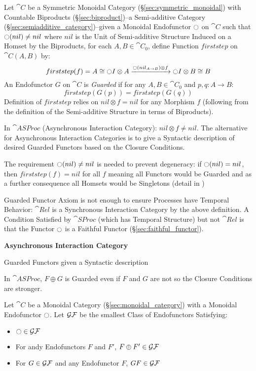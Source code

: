 Let $\cat{C}$ be a Symmetric Monoidal Category
(\S\ref{sec:symmetric_monoidal}) with Countable Biproducts
(\S\ref{sec:biproduct})--a Semi-additive Category
(\S\ref{sec:semiadditive_category})--given a Monoidal Endofunctor $\ocircle$
on $\cat{C}$ such that $\ocircle(nil) \neq nil$ where $nil$ is the
Unit of Semi-additive Structure Induced on a Homset by the Biproducts,
for each $A,B \in \cat{C}_0$, define Function $firststep$ on
$\cat{C}(A,B)$ by:
\[
  firststep(f) = A \cong \ocircle I \otimes A
    \xrightarrow{\ocircle(nil_{A \rightarrow B}) \otimes f}
    \ocircle I \otimes B \cong B
\]
An Endofunctor $G$ on $\cat{C}$ is \emph{Guarded} if for any $A,B \in
\cat{C}_0$ and $p,q : A \rightarrow B$:
\[
  firststep(G(p)) = firststep(G(q))
\]
Definition of $firststep$ relies on $nil \otimes f = nil$ for any
Morphism $f$ (following from the definition of the Semi-additive
Structure in terms of Biproducts).

\fist In $\cat{ASProc}$ (Asynchronous Interaction Category): $nil
\otimes f \neq nil$. The alternative for Asynchronous Interaction
Categories is to give a Syntactic description of desired Guarded
Functors based on the Closure Conditions.

The requirement $\ocircle(nil) \neq nil$ is needed to prevent
degeneracy: if $\ocircle(nil) = nil$, then $firststep(f) = nil$ for
all $f$ meaning all Functors would be Guarded and as a further
consequence all Homsets would be Singletons (detail in
\cite{abramsky-gay-nagarajan96})

Guarded Functor Axiom is not enough to ensure Processes have Temporal
Behavior: $\cat{Rel}$ is a Synchronous Interaction Category by the
above definition. A Condition Satisfied by $\cat{SProc}$ (which has
Temporal Structure) but not $\cat{Rel}$ is that the Functor $\ocircle$
is a Faithful Functor (\S\ref{sec:faithful_functor}).


\textbf{Asynchronous Interaction Category}

Guarded Functors given a Syntactic description

In $\cat{ASProc}$, $F \oplus G$ is Guarded even if $F$ and $G$ are not
so the Closure Conditions are stronger.

Let $\cat{C}$ be a Monoidal Category (\S\ref{sec:monoidal_category})
with a Monoidal Endofunctor $\ocircle$. Let $\mathcal{GF}$ be the
smallest Class of Endofunctors Satisfying:
\begin{itemize}
  \item $\ocircle \in \mathcal{GF}$
  \item For andy Endofunctors $F$ and $F'$, $F \oplus F' \in \mathcal{GF}$
  \item For $G \in \mathcal{GF}$ and any Endofunctor $F$,
    $G F \in \mathcal{GF}$
\end{itemize}

